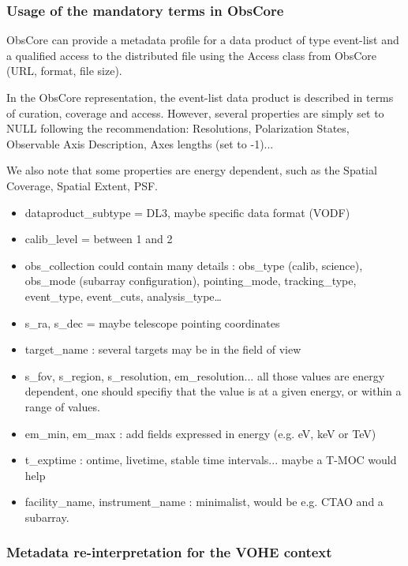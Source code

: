 \documentclass[11pt,a4paper]{ivoa}
\begin{document}
\subsubsection{Usage of the mandatory terms in ObsCore}

ObsCore \citep{2017ivoa.spec.0509L} can provide a metadata profile for a data product of type event-list and a qualified access to the distributed file using the Access class from ObsCore (URL, format, file size).

In the ObsCore representation, the event-list data product is described in terms of curation, coverage and access. However, several properties are simply set to NULL following the recommendation: Resolutions, Polarization States, Observable Axis Description, Axes lengths (set to -1)...

We also note that some properties are energy dependent, such as the Spatial Coverage, Spatial Extent, PSF.


\begin{itemize}
    \item dataproduct\_subtype = DL3, maybe specific data format (VODF)
    \item calib\_level = between 1 and 2
    \item obs\_collection could contain many details : obs\_type (calib, science), obs\_mode (subarray
configuration), pointing\_mode, tracking\_type, event\_type, event\_cuts, analysis\_type…
    \item s\_ra, s\_dec = maybe telescope pointing coordinates
    \item target\_name : several targets may be in the field of view
    \item s\_fov, s\_region, s\_resolution, em\_resolution... all those values are energy dependent, one should specifiy that the value is at a given energy, or within a range of values.
    \item em\_min, em\_max : add fields expressed in energy (e.g. eV, keV or TeV)
    \item t\_exptime : ontime, livetime, stable time intervals... maybe a T-MOC would help
    \item facility\_name, instrument\_name : minimalist, would be e.g. CTAO and a subarray.
\end{itemize}


\subsubsection{Metadata re-interpretation for the VOHE context}
\end{document}
